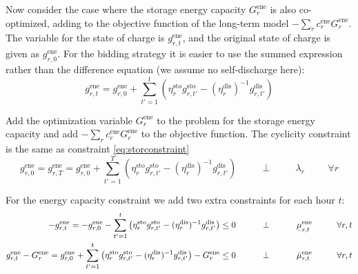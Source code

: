 \documentclass[final,3p]{elsarticle}
\begin{document}
Now consider the case where the storage energy capacity $G^{\textrm{ene}}_r$ is
also co-optimized, adding to the objective function of the long-term model
$-\sum_r c^{\textrm{ene}}_r G^{\textrm{ene}}_r$. The variable for the state of
charge is $g^{\textrm{ene}}_{r,t}$, and the original state of charge is given as
$g^{\textrm{ene}}_{r,0}$. For the bidding strategy it is easier to use the
summed expression rather than the difference equation (we assume no
self-discharge here):
\begin{equation}
  g^{\textrm{ene}}_{r,t} = g^{\textrm{ene}}_{r,0} + \sum_{t'=1}^t \left( \eta^{\textrm{sto}}_r g^{\textrm{sto}}_{r,t'} - (\eta^{\textrm{dis}}_r)^{-1} g^{\textrm{dis}}_{r,t'} \right)
\end{equation}

Add the optimization variable $G^{\textrm{ene}}_r$ to the problem for the
storage energy capacity and add $-\sum_r c^{\textrm{ene}}_r G^{\textrm{ene}}_r$
to the objective function. The cyclicity constraint is the same as constraint
\eqref{eq:storconstraint}
\begin{equation}
  g^{\textrm{ene}}_{r,0} = g^{\textrm{ene}}_{r,T} = g^{\textrm{ene}}_{r,0} + \sum_{t'=1}^T \left( \eta^{\textrm{sto}}_r g^{\textrm{sto}}_{r,t'} - (\eta^{\textrm{dis}}_r)^{-1} g^{\textrm{dis}}_{r,t'} \right)   \hspace{1cm}\perp \hspace{1cm} \lambda_{r} \hspace{1cm} \forall r
\end{equation}

For the energy capacity constraint  we add two extra constraints for each hour
$t$:
\begin{align}
  -g^{\textrm{ene}}_{r,t} =   -g^{\textrm{ene}}_{r,0} - \sum_{t'=1}^t \left( \eta^{\textrm{sto}}_r g^{\textrm{sto}}_{r,t'} - (\eta^{\textrm{dis}}_r)^{-1} g^{\textrm{dis}}_{r,t'} \right) \leq  0  \hspace{1cm}\perp \hspace{1cm} \ubar{\mu}^{\textrm{ene}}_{r,t} \hspace{1cm} \forall r,t \label{eq:enelower} \\
  g^{\textrm{ene}}_{r,t} - G^{\textrm{ene}}_r = g^{\textrm{ene}}_{r,0} + \sum_{t'=1}^t \left( \eta^{\textrm{sto}}_r g^{\textrm{sto}}_{r,t'} - (\eta^{\textrm{dis}}_r)^{-1} g^{\textrm{dis}}_{r,t'} \right) - G^{\textrm{ene}}_r \leq  0  \hspace{1cm}\perp \hspace{1cm} \bar{\mu}^{\textrm{ene}}_{r,t} \hspace{1cm} \forall r,t \label{eq:eneupper}
\end{align}
\end{document}
